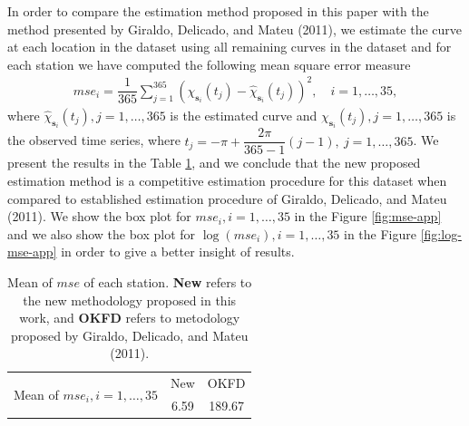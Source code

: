 \documentclass[12pt,]{article}
\theoremstyle{definition}
\theoremstyle{definition}
\theoremstyle{definition}
\theoremstyle{remark}
\begin{document}
In order to compare the estimation method proposed in this paper with the method presented by Giraldo, Delicado, and Mateu (2011), we estimate the curve at each location in the dataset using all remaining curves in the dataset and for each station we have computed the following mean square error measure
\begin{align*}
 mse_i = \dfrac{1}{365} \sum_{j=1}^{365} (\chi_{\bm{s}_i}(t_j) - \hat\chi_{\bm{s}_i}(t_j))^2, \quad i =1, \dots, 35,
\end{align*}
where \(\hat\chi_{\bm{s}_i}(t_j), j=1, \dots, 365\) is the estimated curve and \(\chi_{\bm{s}_i}(t_j), j=1, \dots, 365\) is the observed time series,
where \(t_j = -\pi + \dfrac{2\pi}{365-1}(j-1),\ j=1,\dots, 365\).
We present the results in the Table \ref{tab:error}, and we conclude that the new proposed estimation method is a competitive estimation procedure for this dataset when compared to established estimation procedure of
Giraldo, Delicado, and Mateu (2011). We show the box plot for \(mse_i, i=1, \dots, 35\) in the Figure \ref{fig:mse-app} and we also show the box plot for \(\log(mse_i), i=1, \dots, 35\) in the Figure \ref{fig:log-mse-app} in order to give a better insight of results.

\begin{table}[htbp]
  \centering
  \caption{Mean of $mse$ of each station. \textbf{New} refers to the new methodology proposed in this work, and \textbf{OKFD} refers to metodology proposed by Giraldo, Delicado, and Mateu (2011).}
    \begin{tabular}{lcc}
    \toprule
   \multirow{2}{*}{Mean of $mse_i, i=1,\dots, 35$} & New   & OKFD \\ \cmidrule{2-3}
    & 6.59  & 189.67 \\ \bottomrule
    \end{tabular}
  \label{tab:error}
\end{table}
\end{document}
